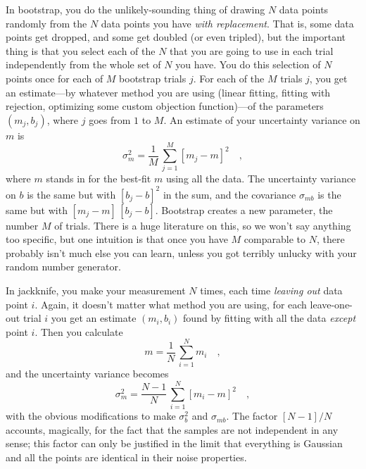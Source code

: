\documentclass[12pt,twoside]{article}
\begin{document}
In bootstrap, you do the unlikely-sounding thing of drawing $N$ data
points randomly from the $N$ data points you have \emph{with
  replacement}.  That is, some data points get dropped, and some get
doubled (or even tripled), but the important thing is that you select
each of the $N$ that you are going to use in each trial independently
from the whole set of $N$ you have.  You do this selection of $N$
points once for each of $M$ bootstrap trials $j$.  For each of the $M$
trials $j$, you get an estimate---by whatever method you are using
(linear fitting, fitting with rejection, optimizing some custom
objection function)---of the parameters $(m_j,b_j)$, where $j$ goes
from $1$ to $M$.  An estimate of your uncertainty variance on $m$ is
\begin{equation}
\sigma_m^2 = \frac{1}{M}\,\sum_{j=1}^M [m_j-m]^2 \quad ,
\end{equation}
where $m$ stands in for the best-fit $m$ using all the data.  The
uncertainty variance on $b$ is the same but with $[b_j-b]^2$ in the
sum, and the covariance $\sigma_{mb}$ is the same but with
$[m_j-m]\,[b_j-b]$.   Bootstrap
creates a new parameter, the number $M$ of trials.  There is a huge
literature on this, so we won't say anything too specific, but one
intuition is that once you have $M$ comparable to $N$, there probably
isn't much else you can learn, unless you got terribly unlucky with
your random number generator.

In jackknife, you make your measurement $N$ times, each time
\emph{leaving out} data point $i$.  Again, it doesn't matter what
method you are using, for each leave-one-out trial $i$ you get an
estimate $(m_i,b_i)$ found by fitting with all the data \emph{except}
point $i$.  Then you calculate
\begin{equation}
m = \frac{1}{N}\,\sum_{i=1}^N m_i \quad ,
\end{equation}
and the uncertainty variance becomes
\begin{equation}
\sigma_m^2 = \frac{N-1}{N}\,\sum_{i=1}^N [m_i-m]^2 \quad ,
\end{equation}
with the obvious modifications to make $\sigma_b^2$ and $\sigma_{mb}$.
The factor $[N-1]/N$ accounts, magically, for the fact that the
samples are not independent in any sense; this factor can only be
justified in the limit that everything is Gaussian and all the points
are identical in their noise properties.
\end{document}
